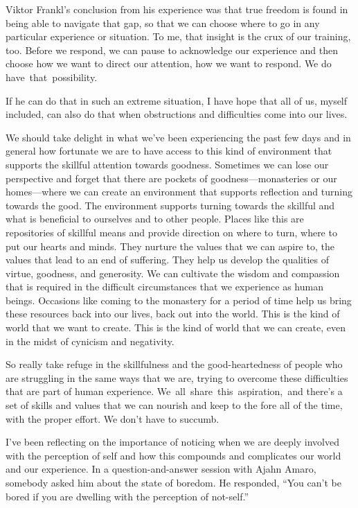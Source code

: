 Viktor Frankl's conclusion from his experience was that true freedom is found in being able to navigate that gap, so that we can choose where to go in any particular experience or situation. To me, that insight is the crux of our training, too. Before we respond, we can pause to acknowledge our experience and then choose how we want to direct our attention, how we want to respond. We do \mbox{have that possibility.}

If he can do that in such an extreme situation, I have hope that all of us, myself included, can also do that when obstructions and difficulties come into our lives.

We should take delight in what we've been experiencing the past few days and in general how fortunate we are to have access to this kind of environment that supports the skillful attention towards goodness. Sometimes we can lose our perspective and forget that there are pockets of goodness---monasteries or our homes---where we can create an environment that supports reflection and turning towards the good. The environment supports turning towards the skillful and what is beneficial to ourselves and to other people. Places like this are repositories of skillful means and provide direction on where to turn, where to put our hearts and minds. They nurture the values that we can aspire to, the values that lead to an end of suffering. They help us develop the qualities of virtue, goodness, and generosity. We can cultivate the wisdom and compassion that is required in the difficult circumstances that we experience as human beings. Occasions like coming to the monastery for a period of time help us bring these resources back into our lives, back out into the world. This is the kind of world that we want to create. This is the kind of world that we can create, even in the midst of cynicism and negativity.

So really take refuge in the skillfulness and the good-heartedness of people who are struggling in the same ways that we are, trying to overcome these difficulties that are part of human experience. \mbox{We all share this aspiration, and} there's a set of skills and values that we can nourish \linebreak and keep to the fore all of the time, with the proper effort. We don't have to succumb.

I've been reflecting on the importance of noticing when we are deeply involved with the perception of self and how this compounds and complicates our world and our experience. In a question-and-answer session with Ajahn Amaro, somebody asked him about the state of boredom. He responded, ``You can't be bored if you are dwelling with the perception of not-self.''


